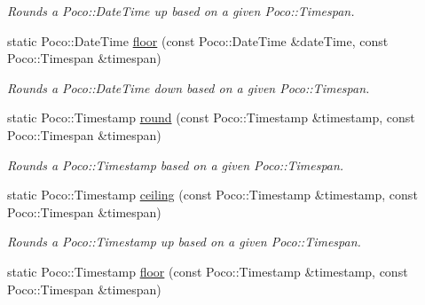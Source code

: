\begin{DoxyCompactItemize}
\begin{DoxyCompactList}\small\item\em Rounds a Poco\-::\-Date\-Time up based on a given Poco\-::\-Timespan. \end{DoxyCompactList}\item 
\hypertarget{classofx_1_1_time_1_1_utils_ac06d1221c0aec6f51b7408e3d2d4a8c6}{static Poco\-::\-Date\-Time \hyperlink{classofx_1_1_time_1_1_utils_ac06d1221c0aec6f51b7408e3d2d4a8c6}{floor} (const Poco\-::\-Date\-Time \&date\-Time, const Poco\-::\-Timespan \&timespan)}\label{classofx_1_1_time_1_1_utils_ac06d1221c0aec6f51b7408e3d2d4a8c6}

\begin{DoxyCompactList}\small\item\em Rounds a Poco\-::\-Date\-Time down based on a given Poco\-::\-Timespan. \end{DoxyCompactList}\item 
\hypertarget{classofx_1_1_time_1_1_utils_a8532e3d23e41864c09c835b83431b677}{static Poco\-::\-Timestamp \hyperlink{classofx_1_1_time_1_1_utils_a8532e3d23e41864c09c835b83431b677}{round} (const Poco\-::\-Timestamp \&timestamp, const Poco\-::\-Timespan \&timespan)}\label{classofx_1_1_time_1_1_utils_a8532e3d23e41864c09c835b83431b677}

\begin{DoxyCompactList}\small\item\em Rounds a Poco\-::\-Timestamp based on a given Poco\-::\-Timespan. \end{DoxyCompactList}\item 
\hypertarget{classofx_1_1_time_1_1_utils_aa7997196c9fdec7964bf3b987001e324}{static Poco\-::\-Timestamp \hyperlink{classofx_1_1_time_1_1_utils_aa7997196c9fdec7964bf3b987001e324}{ceiling} (const Poco\-::\-Timestamp \&timestamp, const Poco\-::\-Timespan \&timespan)}\label{classofx_1_1_time_1_1_utils_aa7997196c9fdec7964bf3b987001e324}

\begin{DoxyCompactList}\small\item\em Rounds a Poco\-::\-Timestamp up based on a given Poco\-::\-Timespan. \end{DoxyCompactList}\item 
\hypertarget{classofx_1_1_time_1_1_utils_ac26ac2bd0091ef78fa1c2469b37eded2}{static Poco\-::\-Timestamp \hyperlink{classofx_1_1_time_1_1_utils_ac26ac2bd0091ef78fa1c2469b37eded2}{floor} (const Poco\-::\-Timestamp \&timestamp, const Poco\-::\-Timespan \&timespan)}\label{classofx_1_1_time_1_1_utils_ac26ac2bd0091ef78fa1c2469b37eded2}


\end{DoxyCompactItemize}
